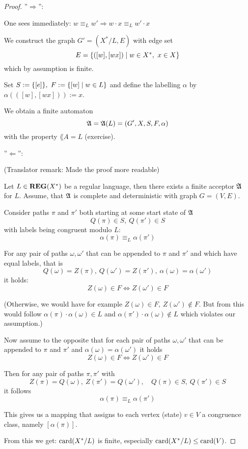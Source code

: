 \begin{proof}
''$\Rightarrow$'':

One sees immediately: $w \equiv_L w' \Rightarrow w \cdot x \equiv_L w' \cdot x$

We construct the graph $G' = (X^*/L, E)$ with edge set
\[ E = \mbox{$\{([w], [wx]) \mid w \in X^*,\ x \in X\}$} \]
which by assumption is finite.

Set $S := \mbox{$\{[e]\}$},\ F := \mbox{$\{[w] \mid w\in L\}$}$ and define the labelling
$\alpha$ by $\alpha(([w], [wx])) := x$.

We obtain a finite automaton \[ \mbox{$\mathfrak{A}$} = \mbox{$\mathfrak{A}$}(L) = (G', X, S, F, \alpha) \]
with the property $\lang{A} = L$ (exercise).

''$\Leftarrow$'':

(Translator remark: Made the proof more readable)

Let $L \in \mbox{{\bf REG}}(X^*)$ be a regular language, then there exists a finite acceptor
$\mbox{$\mathfrak{A}$}$ for $L$. Assume, that $\mbox{$\mathfrak{A}$}$ is complete and deterministic with graph
$G = (V, E)$.

Consider paths $\pi$ and $\pi'$ both starting at some start state of $\mbox{$\mathfrak{A}$}$
\[ Q(\pi) \in S,\ Q(\pi')\in S \]
with labels being congruent modulo $L$:
\[ \alpha(\pi) \equiv_L \alpha(\pi') \]

For any pair of paths $\omega, \omega'$ that can be appended to $\pi$ and $\pi'$
and which have equal labels, that is
\[ Q(\omega) = Z(\pi),\ Q(\omega') = Z(\pi'),\ \alpha(\omega) = \alpha(\omega')
\] it holds: \[ Z(\omega) \in F \iff Z(\omega') \in F \]

(Otherwise, we would have for example $Z(\omega) \in F,\ Z(\omega') \notin F$.
But from this would follow $\alpha(\pi) \cdot \alpha(\omega) \in L$ and
$\alpha(\pi') \cdot \alpha(\omega) \notin L$ which violates our assumption.)

Now assume to the opposite that for each pair of paths $\omega,
\omega'$ that can be appended to $\pi$ and $\pi'$ and $\alpha(\omega) =
\alpha(\omega')$ it holds \[ Z(\omega) \in F \iff Z(\omega') \in F \]

Then for any pair of paths $\pi, \pi'$ with 
\[Z(\pi) = Q(\omega),\ Z(\pi') = Q(\omega'),\quad Q(\pi)\in S,\ Q(\pi') \in S \]
it follows 
\[ \alpha(\pi) \equiv_L \alpha(\pi') \]

This gives us a mapping that assigns to each vertex (state) $v \in V$ a
congruence class, namely $[\alpha(\pi)]$.

From this we get: $\mathrm{card}({X^*/L})$ is finite, especially $\mathrm{card}({X^*/L}) \leq
\mathrm{card}({V})$.
\end{proof}

